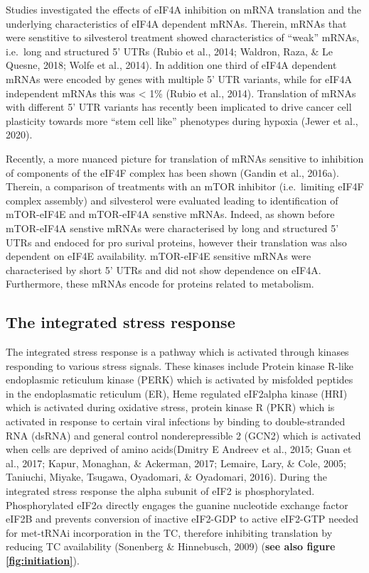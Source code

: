 \documentclass[12pt,openany]{book}
\begin{document}
Studies investigated the effects of eIF4A inhibition on mRNA translation
and the underlying characteristics of eIF4A dependent mRNAs. Therein,
mRNAs that were senstitive to silvesterol treatment showed
characteristics of ``weak'' mRNAs, i.e.~long and structured 5' UTRs
(Rubio et al., 2014; Waldron, Raza, \& Le Quesne, 2018; Wolfe et al.,
2014). In addition one third of eIF4A dependent mRNAs were encoded by
genes with multiple 5' UTR variants, while for eIF4A independent mRNAs
this was \textless{} 1\% (Rubio et al., 2014). Translation of mRNAs with
different 5' UTR variants has recently been implicated to drive cancer
cell plasticity towards more ``stem cell like'' phenotypes during
hypoxia (Jewer et al., 2020).

Recently, a more nuanced picture for translation of mRNAs sensitive to
inhibition of components of the eIF4F complex has been shown (Gandin et
al., 2016a). Therein, a comparison of treatments with an mTOR inhibitor
(i.e.~limiting eIF4F complex assembly) and silvesterol were evaluated
leading to identification of mTOR-eIF4E and mTOR-eIF4A senstive mRNAs.
Indeed, as shown before mTOR-eIF4A senstive mRNAs were characterised by
long and structured 5' UTRs and endoced for pro surival proteins,
however their translation was also dependent on eIF4E availability.
mTOR-eIF4E sensitive mRNAs were characterised by short 5' UTRs and did
not show dependence on eIF4A. Furthermore, these mRNAs encode for
proteins related to metabolism.

\subsection{The integrated stress response}

The integrated stress response is a pathway which is activated through
kinases responding to various stress signals. These kinases include
Protein kinase R-like endoplasmic reticulum kinase (PERK) which is
activated by misfolded peptides in the endoplasmatic reticulum (ER),
Heme regulated eIF2alpha kinase (HRI) which is activated during
oxidative stress, protein kinase R (PKR) which is activated in response
to certain viral infections by binding to double-stranded RNA (dsRNA)
and general control nonderepressible 2 (GCN2) which is activated when
cells are deprived of amino acids(Dmitry E Andreev et al., 2015; Guan et
al., 2017; Kapur, Monaghan, \& Ackerman, 2017; Lemaire, Lary, \& Cole,
2005; Taniuchi, Miyake, Tsugawa, Oyadomari, \& Oyadomari, 2016). During
the integrated stress response the alpha subunit of eIF2 is
phosphorylated. Phosphorylated eIF2\(\alpha\) directly engages the
guanine nucleotide exchange factor eIF2B and prevents conversion of
inactive eIF2-GDP to active eIF2-GTP needed for met-tRNAi incorporation
in the TC, therefore inhibiting translation by reducing TC availability
(Sonenberg \& Hinnebusch, 2009) (\textbf{see also figure
\ref{fig:initiation}}).
\end{document}
